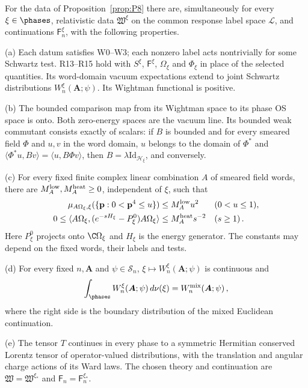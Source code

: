 \begin{proposition}\label{prop:P9}
For the data of Proposition~\ref{prop:P8} there are, simultaneously for every $\xi\in\phases$, relativistic data $\mathfrak W^\xi$ on the common response label space $\mathcal L$, and continuations $\mathsf F_n^\xi$, with the following properties.

(a) Each datum satisfies W0–W3; each nonzero label acts nontrivially for some Schwartz test. R13–R15 hold with $S^\xi$, $\mathsf F^\xi$, $\Omega_\xi$ and $\Phi_\xi$ in place of the selected quantities. Its word-domain vacuum expectations extend to joint Schwartz distributions $W_n^\xi(\boldsymbol A;\psi)$. Its Wightman functional is positive.

(b) The bounded comparison map from its Wightman space to its phase OS space is onto. Both zero-energy spaces are the vacuum line. Its bounded weak commutant consists exactly of scalars: if $B$ is bounded and for every smeared field $\Phi$ and $u,v$ in the word domain, $u$ belongs to the domain of $\Phi^*$ and $\langle\Phi^*u,Bv\rangle=\langle u,B\Phi v\rangle$, then $B=\lambda\mathrm{Id}_{\mathcal H_\xi}$, and conversely.

(c) For every fixed finite complex linear combination $A$ of smeared field words, there are $M_A^{\rm low},M_A^{\rm heat}\ge0$, independent of $\xi$, such that
\begin{equation}\label{eq:P9-1}
\begin{aligned}
\mu_{A\Omega_\xi,\xi}(\{\mathbf p:0<\mathbf p^4\le u\})&\le M_A^{\rm low}u^2&& (0<u\le1),\\
0\le\langle A\Omega_\xi,(e^{-sH_\xi}-P^0_\xi)A\Omega_\xi\rangle&\le M_A^{\rm heat}s^{-2}&& (s\ge1)\,.
\end{aligned}
\end{equation}
Here $P^0_\xi$ projects onto $\C\Omega_\xi$ and $H_\xi$ is the energy generator. The constants may depend on the fixed words, their labels and tests.

(d) For every fixed $n,\boldsymbol A$ and $\psi\in\mathcal S_n$, $\xi\mapsto W_n^\xi(\boldsymbol A;\psi)$ is continuous and
\begin{equation}\label{eq:P9-2}
\int_{\phases}W_n^\xi(\boldsymbol A;\psi)\,d\nu(\xi)=W_n^{\mathrm{mix}}(\boldsymbol A;\psi)\,,
\end{equation}
where the right side is the boundary distribution of the mixed Euclidean continuation.

(e) The tensor $T$ continues in every phase to a symmetric Hermitian conserved Lorentz tensor of operator-valued distributions, with the translation and angular charge actions of its Ward laws. The chosen theory and continuation are $\mathfrak W=\mathfrak W^{\xi_*}$ and $\mathsf F_n=\mathsf F_n^{\xi_*}$.
\end{proposition}

